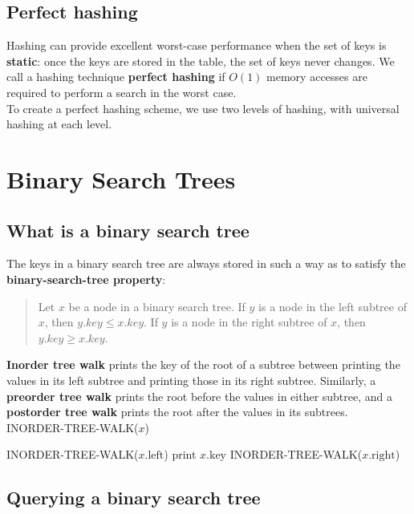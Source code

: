 \documentclass[12pt]{article}
\begin{document}
\subsection{Perfect hashing}

Hashing can provide excellent worst-case performance when the set of keys is \textbf {static}: once the keys are stored in the table, the set of keys never changes. We call a hashing technique \textbf {perfect hashing} if $O(1)$ memory accesses are required to perform a search in the worst case. \\

To create a perfect hashing scheme, we use two levels of hashing, with universal hashing at each level.

\section{Binary Search Trees}

\subsection{What is a binary search tree}

The keys in a binary search tree are always stored in such a way as to satisfy the \textbf {binary-search-tree property}:
\begin{quote}
  Let $x$ be a node in a binary search tree. If $y$ is a node in the left subtree of $x$, then $y.key \le x.key$. If $y$ is a node in the right subtree of $x$, then $y.key \ge x.key$.
\end{quote}
\textbf {Inorder tree walk} prints the key of the root of a subtree between printing the values in its left subtree and printing those in its right subtree. Similarly, a \textbf {preorder tree walk} prints the root before the values in either subtree, and a \textbf {postorder tree walk} prints the root after the values in its subtrees. \\

INORDER-TREE-WALK($x$)
\begin{algorithmic}[1]
\State INORDER-TREE-WALK($x.\text{left}$)
\State print $x.\text{key}$
\State INORDER-TREE-WALK($x.\text{right}$)
\EndIf
\end{algorithmic}

\subsection{Querying a binary search tree}
\end{document}
